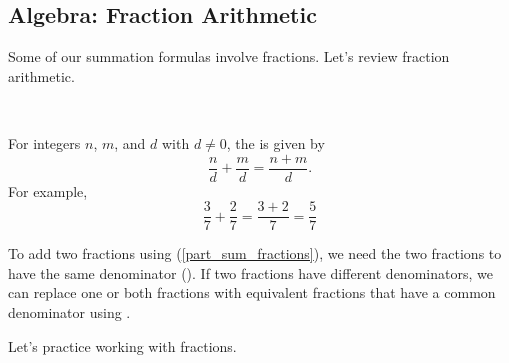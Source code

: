 
\newcommand{\subfracalg}{Algebra: Fraction Arithmetic}
\subsection{\subfracalg}
\label{sub_fraction_algebra}

Some of our summation formulas involve fractions. Let's review fraction arithmetic.

\begin{defn}
\label{defn_fraction_addition}
~
    \begin{apart}        
        \item \label{part_sum_fractions} For integers $n$, $m$, and $d$ with $d \neq 0$, the  is given by
        $$\displaystyle \frac{n}{d} + \frac{m}{d} = \frac{n+m}{d}.
        $$  For example, $$\frac{3}{7} + \frac{2}{7} = \frac{3+2}{7} = \frac{5}{7}$$  
        \item To add two fractions using (\ref{part_sum_fractions}), we need the two fractions to have the same denominator ().  If two fractions have different denominators, we can replace one or both fractions with equivalent fractions that have a common denominator using .
    \end{apart}
\end{defn}

Let's practice working with fractions.

